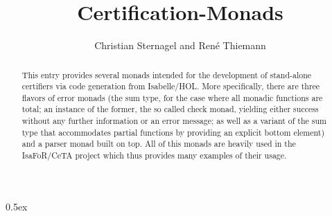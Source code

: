 \documentclass[11pt,a4paper]{article}
\begin{document}
\title{Certification-Monads}
\author{Christian Sternagel and Ren\'e Thiemann}
\maketitle

\begin{abstract}
This entry provides several monads intended for the development of stand-alone
certifiers via code generation from Isabelle/HOL. More specifically, there are
three flavors of error monads (the sum type, for the case where all monadic
functions are total; an instance of the former, the so called check monad,
yielding either success without any further information or an error message; as
well as a variant of the sum type that accommodates partial functions by
providing an explicit bottom element) and a parser monad built on top. All of
this monads are heavily used in the IsaFoR/CeTA project which thus provides many
examples of their usage. 
\end{abstract}

\tableofcontents

\parindent 0pt\parskip 0.5ex


\end{document}
